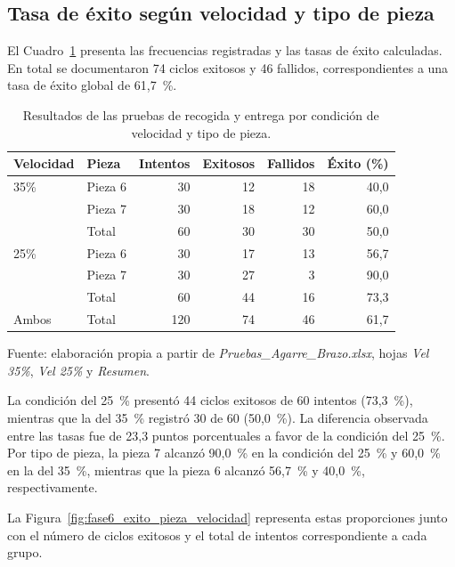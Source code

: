 \subsection{Tasa de éxito según velocidad y tipo de pieza}

El Cuadro~\ref{tab:fase6_resumen_agarre} presenta las frecuencias registradas y las tasas de éxito calculadas. En total se documentaron 74 ciclos exitosos y 46 fallidos, correspondientes a una tasa de éxito global de 61,7~\%.

\begin{table}[H]
    \centering
    \caption{Resultados de las pruebas de recogida y entrega por condición de velocidad y tipo de pieza.}
    \label{tab:fase6_resumen_agarre}
    \begin{tabular}{l l r r r r}
        \hline
        Velocidad & Pieza & Intentos & Exitosos & Fallidos & Éxito (\%) \\
        \hline
        35\% & Pieza 6 & 30 & 12 & 18 & 40,0 \\
             & Pieza 7 & 30 & 18 & 12 & 60,0 \\
             & Total   & 60 & 30 & 30 & 50,0 \\
        \hline
        25\% & Pieza 6 & 30 & 17 & 13 & 56,7 \\
             & Pieza 7 & 30 & 27 & 3  & 90,0 \\
             & Total   & 60 & 44 & 16 & 73,3 \\
        \hline
        Ambos & Total & 120 & 74 & 46 & 61,7 \\
        \hline
    \end{tabular}
    \par\small\raggedright Fuente: elaboración propia a partir de \textit{Pruebas\_Agarre\_Brazo.xlsx}, hojas \textit{Vel 35\%}, \textit{Vel 25\%} y \textit{Resumen}.
\end{table}

La condición del 25~\% presentó 44 ciclos exitosos de 60 intentos (73,3~\%), mientras que la del 35~\% registró 30 de 60 (50,0~\%). La diferencia observada entre las tasas fue de 23,3 puntos porcentuales a favor de la condición del 25~\%. Por tipo de pieza, la pieza 7 alcanzó 90,0~\% en la condición del 25~\% y 60,0~\% en la del 35~\%, mientras que la pieza 6 alcanzó 56,7~\% y 40,0~\%, respectivamente.

La Figura~\ref{fig:fase6_exito_pieza_velocidad} representa estas proporciones junto con el número de ciclos exitosos y el total de intentos correspondiente a cada grupo.

